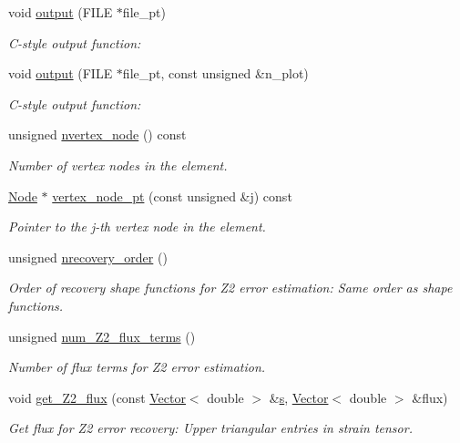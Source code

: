 \begin{DoxyCompactItemize}
void \hyperlink{classoomph_1_1TAxisymmetricLinearElasticityElement_a8a33c1d33c51c47f563aed46f5a9d835}{output} (F\+I\+LE $\ast$file\+\_\+pt)
\begin{DoxyCompactList}\small\item\em C-\/style output function\+: \end{DoxyCompactList}\item 
void \hyperlink{classoomph_1_1TAxisymmetricLinearElasticityElement_a834bb7feb673a5cf90b07ee16f6b1fa5}{output} (F\+I\+LE $\ast$file\+\_\+pt, const unsigned \&n\+\_\+plot)
\begin{DoxyCompactList}\small\item\em C-\/style output function\+: \end{DoxyCompactList}\item 
unsigned \hyperlink{classoomph_1_1TAxisymmetricLinearElasticityElement_a622394d7222ff94019c022ae0cc5bf21}{nvertex\+\_\+node} () const
\begin{DoxyCompactList}\small\item\em Number of vertex nodes in the element. \end{DoxyCompactList}\item 
\hyperlink{classoomph_1_1Node}{Node} $\ast$ \hyperlink{classoomph_1_1TAxisymmetricLinearElasticityElement_ab3bdf47afd764b6f73d967f35cf24794}{vertex\+\_\+node\+\_\+pt} (const unsigned \&j) const
\begin{DoxyCompactList}\small\item\em Pointer to the j-\/th vertex node in the element. \end{DoxyCompactList}\item 
unsigned \hyperlink{classoomph_1_1TAxisymmetricLinearElasticityElement_a0e59e9e92b5e6414a2da13a2b782a155}{nrecovery\+\_\+order} ()
\begin{DoxyCompactList}\small\item\em Order of recovery shape functions for Z2 error estimation\+: Same order as shape functions. \end{DoxyCompactList}\item 
unsigned \hyperlink{classoomph_1_1TAxisymmetricLinearElasticityElement_a8badf4a8ed47cc64b0a728baec1c243a}{num\+\_\+\+Z2\+\_\+flux\+\_\+terms} ()
\begin{DoxyCompactList}\small\item\em Number of \textquotesingle{}flux\textquotesingle{} terms for Z2 error estimation. \end{DoxyCompactList}\item 
void \hyperlink{classoomph_1_1TAxisymmetricLinearElasticityElement_af2c386150c3beb3e4f92cad017b12e1f}{get\+\_\+\+Z2\+\_\+flux} (const \hyperlink{classoomph_1_1Vector}{Vector}$<$ double $>$ \&\hyperlink{cfortran_8h_ab7123126e4885ef647dd9c6e3807a21c}{s}, \hyperlink{classoomph_1_1Vector}{Vector}$<$ double $>$ \&flux)
\begin{DoxyCompactList}\small\item\em Get \textquotesingle{}flux\textquotesingle{} for Z2 error recovery\+: Upper triangular entries in strain tensor. \end{DoxyCompactList}\end{DoxyCompactItemize}
